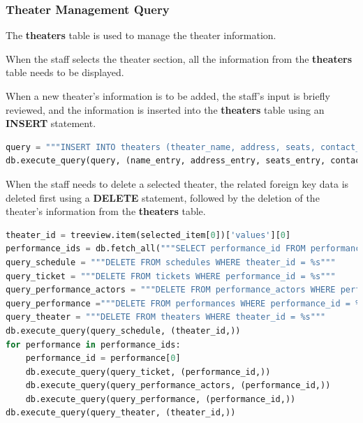 \documentclass[12pt]{article}
\begin{document}
\subsubsection{Theater Management Query}
\par The \textbf{theaters} table is used to manage the theater information.
\par When the staff selects the theater section, all the information from the \textbf{theaters} table needs to be displayed.
\par When a new theater's information is to be added, the staff's input is briefly reviewed, and the information is inserted into the \textbf{theaters} table using an \textbf{INSERT} statement.
\begin{tcolorbox}[colframe=black, colback=white, boxrule=0.4mm, sharp corners=southwest, title=Excerpt of Theater Add Code]
    \begin{lstlisting}[language=Python, breaklines=true]
query = """INSERT INTO theaters (theater_name, address, seats, contact_num) VALUES (%s, %s, %s, %s)"""
db.execute_query(query, (name_entry, address_entry, seats_entry, contact_entry))
\end{lstlisting}
\end{tcolorbox}
\par When the staff needs to delete a selected theater, the related foreign key data is deleted first using a \textbf{DELETE} statement, followed by the deletion of the theater's information from the \textbf{theaters} table.
\begin{tcolorbox}[colframe=black, colback=white, boxrule=0.4mm, sharp corners=southwest, title=Excerpt of Theater Deletion Code]
    \begin{lstlisting}[language=Python, breaklines=true]
theater_id = treeview.item(selected_item[0])['values'][0]
performance_ids = db.fetch_all("""SELECT performance_id FROM performances WHERE theater_id = %s""", (theater_id,))
query_schedule = """DELETE FROM schedules WHERE theater_id = %s"""
query_ticket = """DELETE FROM tickets WHERE performance_id = %s"""
query_performance_actors = """DELETE FROM performance_actors WHERE performance_id = %s"""
query_performance ="""DELETE FROM performances WHERE performance_id = %s"""
query_theater = """DELETE FROM theaters WHERE theater_id = %s"""
db.execute_query(query_schedule, (theater_id,))
for performance in performance_ids:
    performance_id = performance[0]
    db.execute_query(query_ticket, (performance_id,))
    db.execute_query(query_performance_actors, (performance_id,))
    db.execute_query(query_performance, (performance_id,))
db.execute_query(query_theater, (theater_id,))
\end{lstlisting}
\end{tcolorbox}
\end{document}

